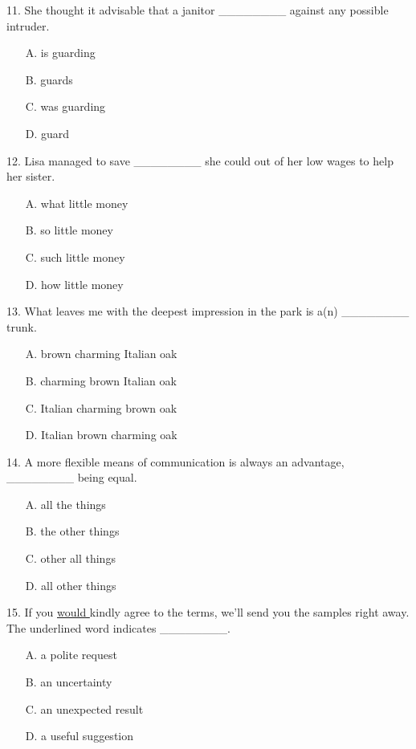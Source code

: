 \documentclass[UTF8,11pt]{ctexart}
\begin{document}
11. She thought it advisable that a janitor \_\_\_\_\_\_\_\_ against any possible intruder.


\begin{itemize}[leftmargin=2em,itemsep=.2em,topsep=.4em]\item[A.] is guarding
\item[B.] guards
\item[C.] was guarding
\item[D.] guard
\end{itemize}

12. Lisa managed to save \_\_\_\_\_\_\_\_ she could out of her low wages to help her sister.


\begin{itemize}[leftmargin=2em,itemsep=.2em,topsep=.4em]\item[A.] what little money
\item[B.] so little money
\item[C.] such little money
\item[D.] how little money
\end{itemize}

13. What leaves me with the deepest impression in the park is a(n) \_\_\_\_\_\_\_\_ trunk.


\begin{itemize}[leftmargin=2em,itemsep=.2em,topsep=.4em]\item[A.] brown charming Italian oak
\item[B.] charming brown Italian oak
\item[C.] Italian charming brown oak
\item[D.] Italian brown charming oak
\end{itemize}

14. A more flexible means of communication is always an advantage, \_\_\_\_\_\_\_\_ being equal.


\begin{itemize}[leftmargin=2em,itemsep=.2em,topsep=.4em]\item[A.] all the things
\item[B.] the other things
\item[C.] other all things
\item[D.] all other things
\end{itemize}

15. If you \uline{would }kindly agree to the terms, we’ll send you the samples right away. The underlined word indicates \_\_\_\_\_\_\_\_.


\begin{itemize}[leftmargin=2em,itemsep=.2em,topsep=.4em]\item[A.] a polite request
\item[B.] an uncertainty
\item[C.] an unexpected result
\item[D.] a useful suggestion
\end{itemize}
\end{document}
